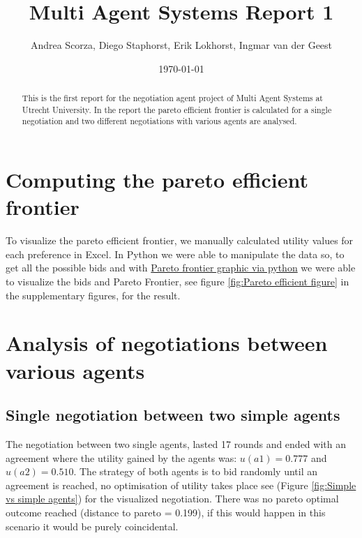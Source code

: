 \documentclass[a4paper]{article}
\title{\vspace{-5em}Multi Agent Systems Report 1}
\author{Andrea Scorza, Diego Staphorst, Erik Lokhorst, Ingmar van der Geest}
\date{\today}
\begin{document}
\maketitle

\begin{abstract}
This is the first report for the negotiation agent project of Multi Agent Systems at Utrecht University. In the report the pareto efficient frontier is calculated for a single negotiation and two different negotiations with various agents are analysed. 
\end{abstract}

\section{Computing the pareto efficient frontier}

To visualize the pareto efficient frontier, we manually calculated utility values for each preference in Excel. In Python we were able to manipulate the data so, to get all the possible bids and with \href{https://sirinnes.wordpress.com/2013/04/25/pareto-frontier-graphic-via-python/}{Pareto frontier graphic via python} we were able to visualize the bids and Pareto Frontier, see figure \ref{fig:Pareto efficient figure} in the supplementary figures, for the result.

\section{Analysis of negotiations between various agents}

\subsection{Single negotiation between two simple agents}
The negotiation between two single agents, lasted 17 rounds and ended with an agreement where the utility gained by the agents was: $u(a1) = 0.777$ and $u(a2) = 0.510$. The strategy of both agents is to bid randomly until an agreement is reached, no optimisation of utility takes place see (Figure \ref{fig:Simple vs simple agents}) for the visualized negotiation. There was no pareto optimal outcome reached (distance to pareto = 0.199), if this would happen in this scenario it would be purely coincidental.
\end{document}
